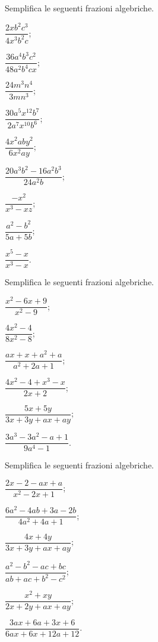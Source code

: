 \begin{esercizio}[\Ast]
\label{ese:14.2}
Semplifica le seguenti frazioni algebriche.
\begin{multicols}{3}
\begin{enumeratea}
 \item $\dfrac{2xb^{2}c^{3}}{4x^{3}b^{2}c}$;
 \item $\dfrac{36a^{4}b^{3} c^{2}}{48a^{2}b^{4}cx}$;
 \item $\dfrac{24m^{3}n^{4}}{3mn^{3}}$;
 \item $\dfrac{30a^{5}x^{12}b^{7}}{2a^{7}x^{10}b^{6}}$;
 \item $\dfrac{4x^{2}aby^{2}}{6x^{2}ay}$;
 \item $\dfrac{20a^{3}b^{2}-16a^{2}b^{3}}{24a^{2}b}$;
 \item $\dfrac{-x^{2}}{x^{3}-xz}$;
 \item $\dfrac{a^{2}-b^{2}}{5a+5b}$;
 \item $\dfrac{x^{5}-x}{x^{3}-x}$.
\end{enumeratea}
\end{multicols}
\end{esercizio}

\begin{esercizio}[\Ast]
\label{ese:14.3}
Semplifica le seguenti frazioni algebriche.
\begin{multicols}{3}
\begin{enumeratea}
 \item $\dfrac{x^{2}-6x+9}{x^{2}-9}$;
 \item $\dfrac{4x^{2}-4}{8x^{2}-8}$;
 \item $\dfrac{ax+x+a^{2}+a}{a^{2}+2a+1}$;
 \item $\dfrac{4x^{2}-4+x^{3}-x}{2x+2}$;
 \item $\dfrac{5x+5y}{3x+3y+ax+ay}$;
 \item $\dfrac{3a^{3}-3a^{2}-a+1}{9a^{4}-1}$.
\end{enumeratea}
\end{multicols}
\end{esercizio}

\begin{esercizio}[\Ast]
\label{ese:14.4}
Semplifica le seguenti frazioni algebriche.
\begin{multicols}{3}
\begin{enumeratea}
 \item $\dfrac{2x-2-ax+a}{x^{2}-2x+1}$;
 \item $\dfrac{6a^{2}-4ab+3a-2b}{4a^{2}+4a+1}$;
 \item $\dfrac{4x+4y}{3x+3y+ax+ay}$;
 \item $\dfrac{a^{2}-b^{2}-ac+bc}{ab+ac+b^{2}-c^{2}}$;
 \item $\dfrac{x^{2}+xy}{2x+2y+ax+ay}$;
 \item $\dfrac{3ax+6a+3x+6}{6ax+6x+12a+12}$.
\end{enumeratea}
\end{multicols}
\end{esercizio}


